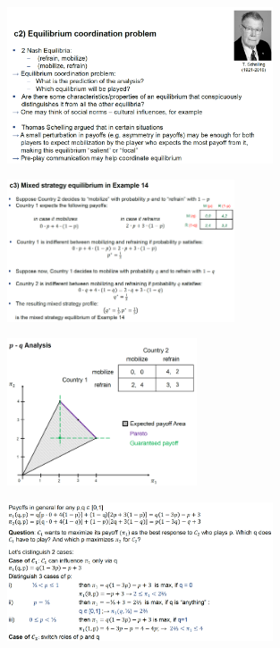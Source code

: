 \begin{figure}[H]
    \centering
    \includegraphics[width=0.7\textwidth]{Pictures/chicken_equilibrium.png}
\end{figure}

\begin{figure}[H]
    \centering
    \includegraphics[width=0.6\textwidth]{Pictures/chicken_mixed_strategy.png}
\end{figure}

\begin{figure}[H]
    \centering
    \includegraphics[width=0.5\textwidth]{Pictures/chicken_q_p_analysis.png}
\end{figure}

\begin{figure}[H]
    \centering
    \includegraphics[width=0.7\textwidth]{Pictures/chicken_payoffs.png}
\end{figure}

